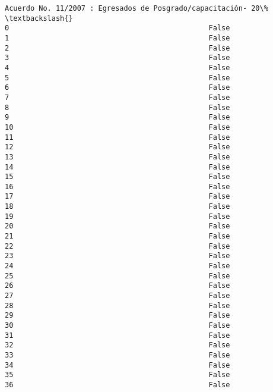 \documentclass[11pt]{article}
\begin{document}
\begin{Verbatim}[commandchars=\\\{\}]
    Acuerdo No. 11/2007 : Egresados de Posgrado/capacitación- 20\%  \textbackslash{}
0                                               False               
1                                               False               
2                                               False               
3                                               False               
4                                               False               
5                                               False               
6                                               False               
7                                               False               
8                                               False               
9                                               False               
10                                              False               
11                                              False               
12                                              False               
13                                              False               
14                                              False               
15                                              False               
16                                              False               
17                                              False               
18                                              False               
19                                              False               
20                                              False               
21                                              False               
22                                              False               
23                                              False               
24                                              False               
25                                              False               
26                                              False               
27                                              False               
28                                              False               
29                                              False               
30                                              False               
31                                              False               
32                                              False               
33                                              False               
34                                              False               
35                                              False               
36                                              False               

\end{Verbatim}
\end{document}
